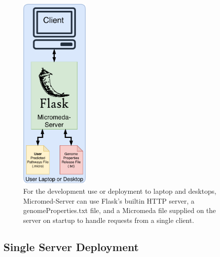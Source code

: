 \begin{figure}[!ht]
  \centering
	\includegraphics[width=0.30\textwidth]{media/micromeda-simple-deployment.pdf}
	 \caption{For the development use or deployment to laptop and desktops, Micromed-Server can use Flask's builtin HTTP server, a genomeProperties.txt file, and a Micromeda file supplied on the server on startup to handle requests from a single client.}
	 \label{fig:micromeda-small-deploy}
\end{figure}

\subsection{Single Server Deployment}

